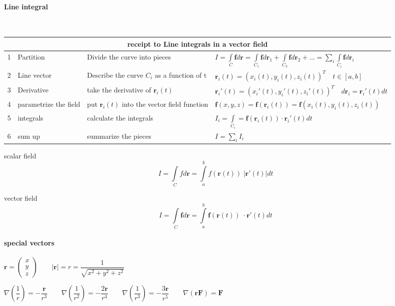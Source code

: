 	\paragraph{Line integral}~\\
	\begin{tabularx}{\columnwidth}{lp{2.5cm}p{4cm}X}
	\hline 
		\multicolumn{4}{c}{receipt to Line integrals in a vector field}\\
	\hline 
		1& Partition & Divide the curve into pieces & $I = \int\limits_C\bm fd\bm r = \int\limits_{C_1}\bm fd\bm r_1 + \int\limits_{C_2}\bm fd\bm r_2+\dots = \sum\limits_i \int\limits_{C_i}\bm fd\bm r_i$\\
		2& Line vector& 
		 Describe the curve $C_i$ as a function of t & $\bm r_i(t) = \left(x_i(t), y_i(t), z_i(t)\right)^T\quad t\in[a,b]$\\
		3& Derivative & take the derivative of $\bm r_i(t)$ & $\bm r_i'(t) = \left(x_i'(t), y_i'(t), z_i'(t)\right)^T \quad d\bm r_i = \bm r_i'(t) dt $\\
		4& parametrize the field  & put $\bm r_i(t)$ into the vector field function & $\bm f(x,y,z) = \bm f(\bm r_i(t) ) = \bm f(x_i(t), y_i(t), z_i(t))$\\
		5& integrals & calculate the integrals & $I_i = \int\limits_{C_i} = \bm f(\bm r_i(t))\cdot \bm r_i'(t)dt$\\
		6& sum up & summarize the pieces & $I = \sum\limits_i I_i$\\
		\hline 
	\end{tabularx}
	scalar field $$I = \int\limits_C f d \bm r = \int\limits_{a}^b f(\bm r(t))\; |\bm r'(t)| dt$$
	
	vector field $$I = \int\limits_C \bm f d\bm r = \int\limits_{a}^b \bm f(\bm r(t))\; \cdot \bm r'(t) dt$$
		
	\paragraph{special vectors}  
	$\bm r = \begin{pmatrix} x\\y\\z\end{pmatrix} \qquad |\bm r| = r = \dfrac{1}{\sqrt{x^2+y^2+z^2}}$
	
	$\nabla\left(\dfrac{1}{r}\right) = -\dfrac{\bm r}{r^3}\qquad
	\nabla\left(\dfrac{1}{r^2}\right) = -\dfrac{2\bm r}{r^4}\qquad
	\nabla\left(\dfrac{1}{r^3}\right) = -\dfrac{3\bm r}{r^5}\qquad
	\nabla (\bm r \bm F) = \bm F$

